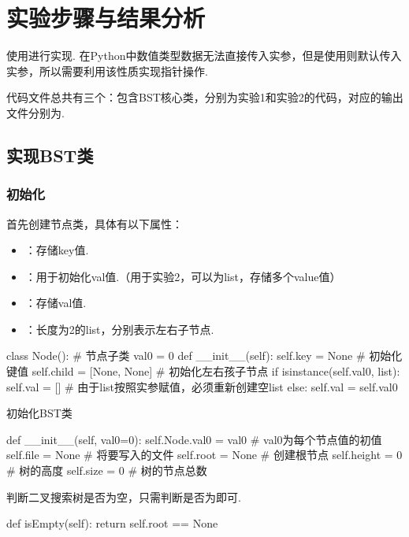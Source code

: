 \documentclass[12pt, a4paper, oneside]{ctexart}
\numberwithin{equation}{section}  %
\begin{document}
\section{实验步骤与结果分析}
使用进行实现. 在Python中数值类型数据无法直接传入实参，但是使用则默认传入实参，所以需要利用该性质实现指针操作.

代码文件总共有三个：包含BST核心类，分别为实验1和实验2的代码，对应的输出文件分别为.
\subsection{实现BST类}
\subsubsection{初始化}
首先创建节点类，具体有以下属性：
\begin{itemize}
    \item {}：存储key值.
    \item {}：用于初始化val值.（用于实验2，可以为list，存储多个value值）
    \item {}：存储val值.
    \item {}：长度为2的list，分别表示左右子节点.
\end{itemize}
\begin{pythoncode}
class Node():  # 节点子类
    val0 = 0
    def __init__(self):
        self.key = None  # 初始化键值
        self.child = [None, None]  # 初始化左右孩子节点
        if isinstance(self.val0, list):
            self.val = []  # 由于list按照实参赋值，必须重新创建空list
        else: self.val = self.val0
\end{pythoncode}

初始化BST类
\begin{pythoncode}
def __init__(self, val0=0):
    self.Node.val0 = val0  # val0为每个节点值的初值
    self.file = None  # 将要写入的文件
    self.root = None  # 创建根节点
    self.height = 0  # 树的高度
    self.size = 0  # 树的节点总数
\end{pythoncode}

判断二叉搜索树是否为空，只需判断是否为即可.
\begin{pythoncode}
def isEmpty(self):
    return self.root == None
\end{pythoncode}
\end{document}

